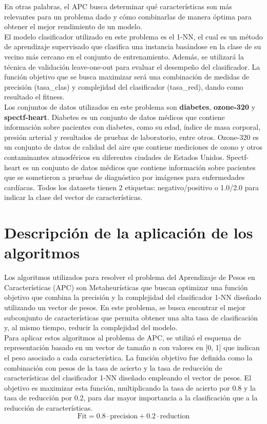 En otras palabras, el APC busca determinar qué características son más relevantes para un problema dado y cómo combinarlas de manera óptima para obtener el mejor rendimiento de un modelo. \\

El modelo clasificador utilizado en este problema es el 1-NN, el cual es un método de aprendizaje supervisado que clasifica una instancia basándose en la clase de su vecino más cercano en el conjunto de entrenamiento. Además, se utilizará la técnica de validación leave-one-out para evaluar el desempeño del clasificador. La función objetivo que se busca maximizar será una combinación de medidas de precisión (tasa\_clas) y complejidad del clasificador (tasa\_red), dando como resultado el fitness.\\

Los conjuntos de datos utilizados en este problema son \textbf{diabetes}, \textbf{ozone-320} y \textbf{spectf-heart}. Diabetes es un conjunto de datos médicos que contiene información sobre pacientes con diabetes, como su edad, índice de masa corporal, presión arterial y resultados de pruebas de laboratorio, entre otros. Ozone-320 es un conjunto de datos de calidad del aire que contiene mediciones de ozono y otros contaminantes atmosféricos en diferentes ciudades de Estados Unidos. Spectf-heart es un conjunto de datos médicos que contiene información sobre pacientes que se sometieron a pruebas de diagnóstico por imágenes para enfermedades cardíacas. Todos los datasets tienen 2 etiquetas: negativo/positivo o 1.0/2.0 para indicar la clase del vector de características.  
\newpage

\section{Descripción de la aplicación de los algoritmos}
Los algoritmos utilizados para resolver el problema del Aprendizaje de Pesos en Características (APC) son Metaheurísticas que buscan optimizar una función objetivo que combina la precisión y la complejidad del clasificador 1-NN diseñado utilizando un vector de pesos. En este problema, se busca encontrar el mejor subconjunto de características que permita obtener una alta tasa de clasificación y, al mismo tiempo, reducir la complejidad del modelo. \\

Para aplicar estos algoritmos al problema de APC, se utilizó el esquema de representación basado en un vector de tamaño n con valores en [0, 1] que indican el peso asociado a cada característica. La función objetivo fue definida como la combinación con pesos de la tasa de acierto y la tasa de reducción de características del clasificador 1-NN diseñado empleando el vector de pesos. El objetivo es maximizar esta función, multiplicando la tasa de acierto por 0.8 y la tasa de reducción por 0.2, para dar mayor importancia a la clasificación que a la reducción de características.
\[\text{Fit} = 0.8 \cdot \text{precision} + 0.2 \cdot \text{reduction}\]

